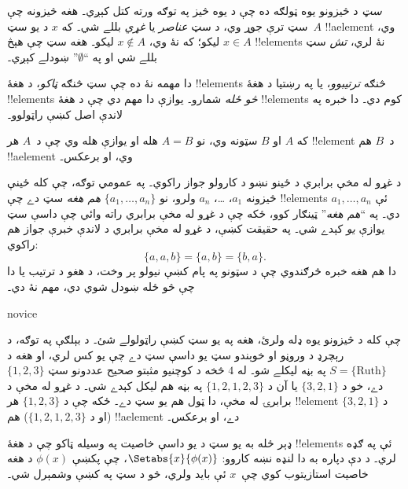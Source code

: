\documentclass[../../../include/open-logic-section]{subfiles}
\begin{document}

\emph{سټ} د څيزونو يوه ټولګه ده چې د يوه څيز په توګه ورته کتل کېږي۔ هغه څيزونه چې سټ ترې جوړ وي، د سټ \emph{عناصر} يا \emph{غړي} بللے شي۔ که $x$ د يو سټ~$A$ !!a{element} وي، $x \in A$ ليکو؛ که نۀ وي، $x \notin A$ ليکو۔ هغه سټ چې هېڅ !!{element}s نۀ لري، \emph{تش} سټ بللے شي او په ``$\emptyset$'' ښودلے کېږي۔

\begin{explain}
دا مهمه نۀ ده چې سټ څنګه \emph{ټاکو}، د هغۀ !!{element}s څنګه \emph{ترتيبوو}، يا په رښتيا د هغۀ !!{element}s \emph{څو ځله} شمارو۔ يوازې دا مهم دي چې د هغۀ !!{element}s کوم دي۔ دا خبره په لاندې اصل کښې راټولوو۔
\end{explain}

\begin{defn}
  که $A$ او $B$ سټونه وي، نو $A = B$ هله او يوازې هله وي چې د~$A$ هر !!{element} د~$B$ هم !!a{element} وي، او برعکس۔
\end{defn}

د غړو له مخې برابري د ځينو نښو د کارولو جواز راکوي۔ په عمومي توګه، چې کله ځينې څيزونه $a_{1}$، \dots، $a_{n}$ ولرو، نو $\{a_{1}, \dots, a_{n}\}$ \emph{هم هغه} سټ دے چې !!{element}s ئې $a_1, \ldots, a_n$ دي۔ په ``\emph{هم هغه}'' ټينګار کوو، ځکه چې د غړو له مخې برابري راته وائي چې داسې سټ يوازې \emph{يو} کېدے شي۔ په حقيقت کښې، د غړو له مخې برابري د لاندې خبرې جواز هم راکوي:
  \[
    \{a, a, b\} = \{a, b\} = \{b,a\}.
  \]
دا هم هغه خبره څرګندوي چې د سټونو په پام کښې نيولو پر وخت، د هغو د  ترتيب يا دا چې څو ځله ښودل شوي دي، مهم نۀ دي۔

\begin{tagblock}{novice}
\begin{ex}
چې کله د څيزونو يوه ډله ولرئ، هغه په يو سټ کښې راټولولے شئ۔ د بېلګې په توګه، د رېچرډ د وروڼو او خوېندو سټ يو داسې سټ دے چې يو کس لري، او هغه د $S=\{\textrm{Ruth}\}$ په بڼه ليکلے شو۔ له $4$ څخه د کوچنيو مثبتو صحيح عددونو سټ $\{1, 2, 3\}$ دے، خو د $\{3, 2, 1\}$ يا آن د $\{1, 2, 1, 2, 3\}$ په بڼه هم ليکل کېدے شي۔ د غړو له مخې د برابرۍ له مخې، دا ټول هم يو سټ دے۔ ځکه چې د $\{1, 2, 3\}$ هر !!{element} د $\{3, 2, 1\}$ (او د $\{1, 2, 1, 2, 3\}$) هم !!a{element} دے، او برعکس۔
\end{ex}
\end{tagblock}

ډېر ځله به يو سټ د يو داسې خاصيت په وسيله ټاکو چې د هغۀ !!{element}s ئې په ګډه لري۔ د دې دپاره به دا لنډه نښه کاروو: $\Setabs{x}{\phi(x)}$، چې پکښې $\phi(x)$ د هغه خاصيت استازيتوب کوي چې~$x$ ئې بايد ولري، څو د سټ په  کښې وشمېرل شي۔
\end{document}
